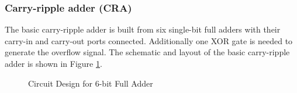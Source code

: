 \documentclass[conference]{IEEEtran}
\begin{document}
\subsubsection{Carry-ripple adder (CRA)}

The basic carry-ripple adder is built from six single-bit full adders with their carry-in and carry-out ports connected. Additionally one XOR gate is needed to generate the overflow signal. The schematic and layout of the basic carry-ripple adder is shown in Figure \ref{fig:fulladder6}.
\begin{figure}[h]
\centerline{
\hfil
{}}
\caption{Circuit Design for 6-bit Full Adder}
\label{fig:fulladder6}
\end{figure}
\end{document}
